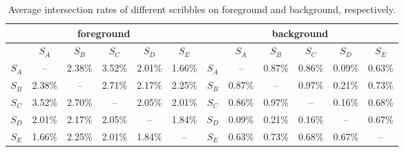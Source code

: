 \documentclass[runningheads,a4paper]{llncs}
\begin{document}
\begin{table}[!h]
\centering
\vspace{-0.2cm}
\caption{Average intersection rates of different scribbles on foreground and background, respectively.}
\begin{tabular}{c|c|c|c|c|c||c|c|c|c|c|c}
\hline
\multicolumn{6}{c||}{foreground} &\multicolumn{6}{c}{background}\\
\hline
& $S_{A}$ & $S_{B}$ & $S_{C}$ & $S_{D}$ & $S_{E}$ && $S_{A}$ & $S_{B}$ & $S_{C}$ & $S_{D}$ & $S_{E}$ \\
\hline
$S_{A}$ & -- & 2.38\% & 3.52\% & 2.01\%& 1.66\% &$S_{A}$ & -- & 0.87\% & 0.86\% & 0.09\%& 0.63\% \\
\hline
$S_{B}$ & 2.38\% & -- & 2.71\% & 2.17\%& 2.25\% &$S_{B}$ & 0.87\% & -- & 0.97\% & 0.21\%& 0.73\% \\
\hline
$S_{C}$ & 3.52\% & 2.70\% & -- & 2.05\%& 2.01\% &$S_{C}$ & 0.86\% & 0.97\% & -- & 0.16\%& 0.68\%\\
\hline
$S_{D}$ & 2.01\% & 2.17\% & 2.05\% & -- & 1.84\% &$S_{D}$ & 0.09\% & 0.21\% & 0.16\% & -- & 0.67\% \\
\hline
$S_{E}$ & 1.66\% & 2.25\% & 2.01\% & 1.84\%& -- &$S_{E}$ & 0.63\% & 0.73\% & 0.68\% & 0.67\% & -- \\
\hline
\end{tabular}
\label{tab:sb-IR}
\end{table}


\end{document}
